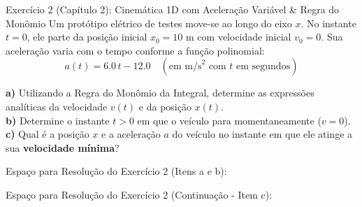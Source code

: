\documentclass[10pt,a4paper]{article}
\begin{document}
\vspace{4pt}

\begin{problembox}{Exercício 2 (Capítulo 2): Cinemática 1D com Aceleração Variável \& Regra do Monômio}
Um protótipo elétrico de testes move-se ao longo do eixo $x$. No instante $t = 0$, ele parte da posição inicial $x_0 = 10\text{ m}$ com velocidade inicial $v_0 = 0$. Sua aceleração varia com o tempo conforme a função polinomial:
$$a(t) = 6.0 \, t - 12.0 \quad (\text{em m/s}^2 \text{ com } t \text{ em segundos})$$

\textbf{a)} Utilizando a Regra do Monômio da Integral, determine as expressões analíticas da velocidade $v(t)$ e da posição $x(t)$.\\
\textbf{b)} Determine o instante $t > 0$ em que o veículo para momentaneamente ($v = 0$).\\
\textbf{c)} Qual é a posição $x$ e a aceleração $a$ do veículo no instante em que ele atinge a sua \textbf{velocidade mínima}?
\end{problembox}

\begin{solutionarea}{Espaço para Resolução do Exercício 2 (Itens a e b):}
    \vspace{6.0cm}
\end{solutionarea}

\newpage %

\begin{solutionarea}{Espaço para Resolução do Exercício 2 (Continuação - Item c):}
    \vspace{4.8cm}
\end{solutionarea}

\vspace{4pt}
\end{document}
